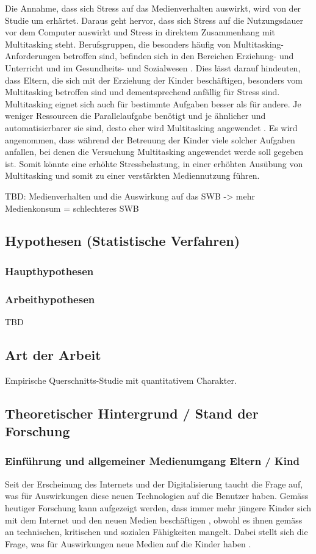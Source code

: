 Die Annahme, dass sich Stress auf das Medienverhalten auswirkt, wird von der Studie um  erhärtet. Daraus geht hervor, dass sich Stress auf die Nutzungsdauer vor dem Computer auswirkt und Stress in direktem Zusammenhang mit Multitasking steht. Berufsgruppen, die besonders häufig von Multitasking-Anforderungen betroffen sind, befinden sich in den Bereichen Erziehung- und Unterricht und im Gesundheits- und Sozialwesen \cite{Lohmann2012}. Dies lässt darauf hindeuten, dass Eltern, die sich mit der Erziehung der Kinder beschäftigen, besonders vom Multitasking betroffen sind und dementsprechend anfällig für Stress sind. Multitasking eignet sich auch für bestimmte Aufgaben besser als für andere. Je weniger Ressourcen die Parallelaufgabe benötigt und je ähnlicher und automatisierbarer sie sind, desto eher wird Multitasking angewendet \cite[S.~10]{Zimber2016}. Es wird angenommen, dass während der Betreuung der Kinder viele solcher Aufgaben anfallen, bei denen die Versuchung Multitasking angewendet werde soll gegeben ist. Somit könnte eine erhöhte Stressbelastung, in einer erhöhten Ausübung von Multitasking und somit zu einer verstärkten Mediennutzung führen.


TBD: Medienverhalten und die Auswirkung auf das SWB -> mehr Medienkonsum = schlechteres SWB


\subsection{Hypothesen (Statistische Verfahren)}
\subsubsection{Haupthypothesen}
\subsubsection{Arbeithypothesen}
TBD
\subsection{Art der Arbeit}
Empirische Querschnitts-Studie mit quantitativem Charakter.
\subsection{Theoretischer Hintergrund / Stand der Forschung}
\subsubsection{Einführung und allgemeiner Medienumgang Eltern / Kind}
Seit der Erscheinung des Internets und der Digitalisierung taucht die Frage auf, was für Auswirkungen diese neuen Technologien auf die Benutzer haben. Gemäss heutiger Forschung kann aufgezeigt werden, dass immer mehr jüngere Kinder sich mit dem Internet und den neuen Medien beschäftigen \cite{Rideout2013, Chaudron2015}, obwohl es ihnen gemäss  an technischen, kritischen und sozialen Fähigkeiten mangelt. Dabei stellt sich die Frage, was für Auswirkungen neue Medien auf die Kinder haben \cite{Tomopoulos2010, Pempek2014, Livingstone2015, Masur2015, Troseth2016}. 

